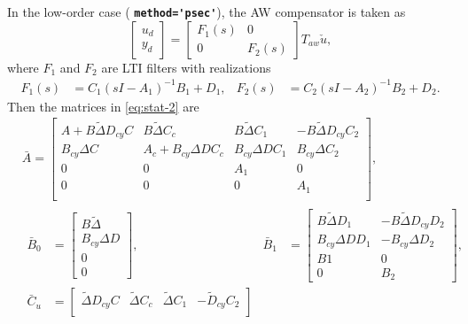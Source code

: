 \documentclass[fleqn,11pt]{article}
\newcommand{\lcode}[1]{\textbf{%
    \lstinline[style=mystyle]{#1}}}
\begin{document}
In the low-order case (\lcode{method='psec'}), the AW compensator is taken as
\begin{equation}\label{eq:stat-1}
    \begin{bmatrix} u_d \\ y_d \end{bmatrix} =
    \begin{bmatrix} F_1(s) & 0 \\ 0 & F_2(s) \end{bmatrix}
    T_{aw}\check{u},
\end{equation}
where $F_1$ and $F_2$ are LTI filters with realizations
\begin{align*}
    F_1(s) &= C_1(sI-A_1)^{-1}B_1+D_1, &
    F_2(s) &= C_2(sI-A_2)^{-1}B_2+D_2.
\end{align*}
Then the matrices in \cref{eq:stat-2} are
\begin{align*}
    &\bar A = \begin{bmatrix}
                A+B\tilde\Delta D_{cy}C & B\tilde\Delta C_{c} & B\tilde\Delta C_1  & -B\tilde\Delta D_{cy}C_2\\
                B_{cy}\Delta C & A_{c}+B_{cy}\Delta D C_{c} & B_{cy}\Delta D C_1 & B_{cy}\Delta C_2\\
                0 & 0 & A_1 & 0\\
                0 & 0 & 0 & A_1\\
             \end{bmatrix},\\
    &
    \begin{aligned}
    \bar B_{0} &= \begin{bmatrix}
                B\tilde\Delta\\
                B_{cy}\Delta D\\
                0\\0
            \end{bmatrix},&
    \bar B_{1} &= \begin{bmatrix}
                B\tilde\Delta D_1 & -B\tilde\Delta D_{cy}D_2\\
                B_{cy}\Delta D D_1 & -B_{cy}\Delta D_2\\
                B1 & 0 \\ 0 & B_2
            \end{bmatrix},\\
    \bar C_{u} &= \begin{bmatrix}
                \tilde\Delta D_{cy}C & \tilde\Delta C_{c} & \tilde\Delta C_1 &
                -\tilde D_{cy}C_2\\

\end{bmatrix}
\end{aligned}
\end{align*}
\end{document}
